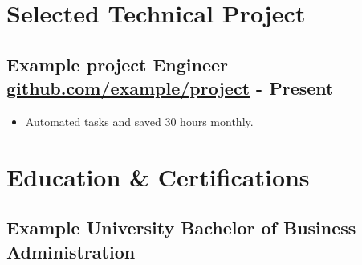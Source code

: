 \documentclass[10pt,a4paper]{article}
\begin{document}
\section*{Selected Technical Project}
\subsection*{Example project \textbar{} Engineer \textbar{} \href{https://github.com/example/project}{github.com/example/project}\hfill{ - Present}}
\begin{itemize}
\item Automated tasks and saved 30 hours monthly.
\end{itemize}
\section*{Education \& Certifications}
\subsection*{Example University \textbar{} Bachelor of Business Administration}
\end{document}
